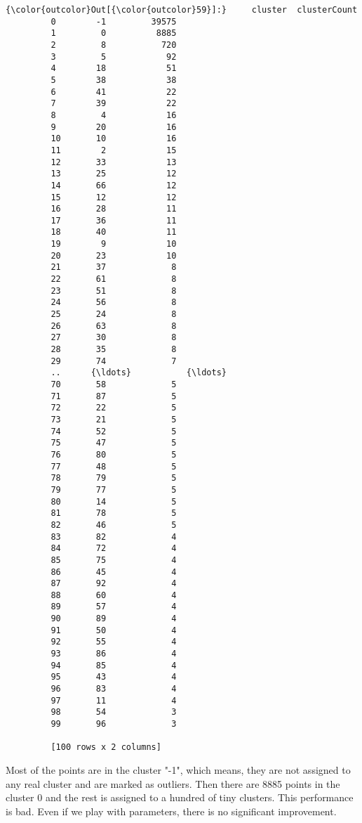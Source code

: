 \documentclass[11pt]{article}
\begin{document}
\begin{Verbatim}[commandchars=\\\{\}]
{\color{outcolor}Out[{\color{outcolor}59}]:}     cluster  clusterCount
         0        -1         39575
         1         0          8885
         2         8           720
         3         5            92
         4        18            51
         5        38            38
         6        41            22
         7        39            22
         8         4            16
         9        20            16
         10       10            16
         11        2            15
         12       33            13
         13       25            12
         14       66            12
         15       12            12
         16       28            11
         17       36            11
         18       40            11
         19        9            10
         20       23            10
         21       37             8
         22       61             8
         23       51             8
         24       56             8
         25       24             8
         26       63             8
         27       30             8
         28       35             8
         29       74             7
         ..      {\ldots}           {\ldots}
         70       58             5
         71       87             5
         72       22             5
         73       21             5
         74       52             5
         75       47             5
         76       80             5
         77       48             5
         78       79             5
         79       77             5
         80       14             5
         81       78             5
         82       46             5
         83       82             4
         84       72             4
         85       75             4
         86       45             4
         87       92             4
         88       60             4
         89       57             4
         90       89             4
         91       50             4
         92       55             4
         93       86             4
         94       85             4
         95       43             4
         96       83             4
         97       11             4
         98       54             3
         99       96             3
         
         [100 rows x 2 columns]
\end{Verbatim}
            
    Most of the points are in the cluster "-1", which means, they are not
assigned to any real cluster and are marked as outliers. Then there are
8885 points in the cluster 0 and the rest is assigned to a hundred of
tiny clusters. This performance is bad. Even if we play with parameters,
there is no significant improvement.
\end{document}
